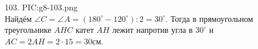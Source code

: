 103. {{PIC:g8-103.png}}\\
Найдём $\angle C=\angle A=(180^\circ-120^\circ):2=30^\circ.$ Тогда в прямоугольном треугольнике $AHC$ катет $AH$ лежит напротив угла в $30^\circ$ и $AC=2AH=2\cdot15=30$см.\newpage\noindent
